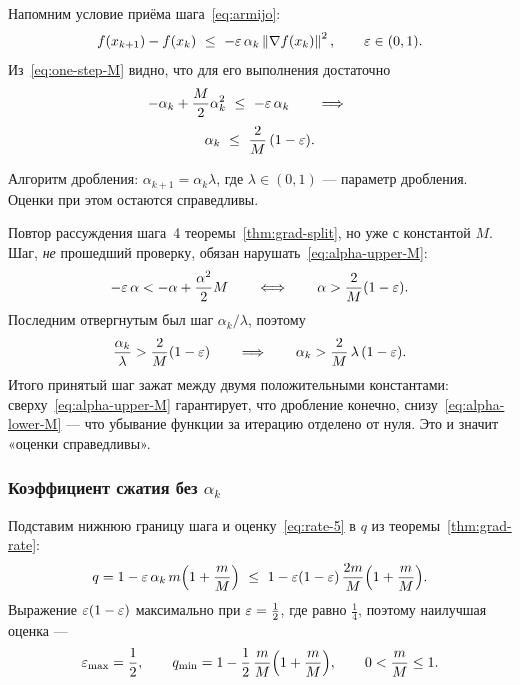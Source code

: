 Напомним условие приёма шага~\eqref{eq:armijo}:
\[
  f(x_{k+1}) - f(x_k) \ \le\ -\varepsilon\, \alpha_k \left\lVert \nabla f(x_k) \right\rVert^2 ,
  \qquad \varepsilon \in (0,1) .
\]
Из~\eqref{eq:one-step-M} видно, что для его выполнения достаточно
\[
  -\alpha_k + \frac{M}{2}\alpha_k^2 \ \le\ -\varepsilon\,\alpha_k
  \qquad\Longrightarrow\qquad
\]
\begin{equation}\label{eq:alpha-upper-M}
  \alpha_k \ \le\ \frac{2}{M}\,(1 - \varepsilon) .
\end{equation}

\begin{remark}
Алгоритм дробления: $\alpha_{k+1} = \alpha_k \lambda$, где $\lambda \in (0,1)$ —
параметр дробления. Оценки при этом остаются справедливы.
\end{remark}

\begin{idea}[title={Почему дробление не портит оценки}]
Повтор рассуждения шага~4 теоремы~\ref{thm:grad-split}, но уже с константой $M$.
Шаг, \emph{не} прошедший проверку, обязан нарушать~\eqref{eq:alpha-upper-M}:
\[
  -\varepsilon\,\alpha < -\alpha + \frac{\alpha^2}{2}M
  \qquad\Longleftrightarrow\qquad
  \alpha > \frac{2}{M}(1 - \varepsilon) .
\]
Последним отвергнутым был шаг $\alpha_k / \lambda$, поэтому
\begin{equation}\label{eq:alpha-lower-M}
  \frac{\alpha_k}{\lambda} > \frac{2}{M}(1 - \varepsilon)
  \qquad\Longrightarrow\qquad
  \alpha_k > \frac{2}{M}\,\lambda\,(1 - \varepsilon) .
\end{equation}
Итого принятый шаг зажат между двумя положительными константами:
сверху~\eqref{eq:alpha-upper-M} гарантирует, что дробление конечно,
снизу~\eqref{eq:alpha-lower-M} — что убывание функции за итерацию отделено от
нуля. Это и значит «оценки справедливы».
\end{idea}

\subsubsection*{Коэффициент сжатия без $\alpha_k$}

Подставим нижнюю границу шага и оценку~\eqref{eq:rate-5} в $q$ из
теоремы~\ref{thm:grad-rate}:
\[
  q = 1 - \varepsilon\,\alpha_k\, m\Big(1 + \frac{m}{M}\Big)
    \ \le\ 1 - \varepsilon(1-\varepsilon)\,\frac{2m}{M}\Big(1 + \frac{m}{M}\Big) .
\]
Выражение $\varepsilon(1-\varepsilon)$ максимально при $\varepsilon = \tfrac12$, где равно $\tfrac14$,
поэтому наилучшая оценка —
\begin{equation}\label{eq:q-min}
  \varepsilon_{\max} = \frac{1}{2} ,
  \qquad
  q_{\min} = 1 - \frac{1}{2}\,\frac{m}{M}\Big(1 + \frac{m}{M}\Big) ,
  \qquad 0 < \frac{m}{M} \le 1 .
\end{equation}

